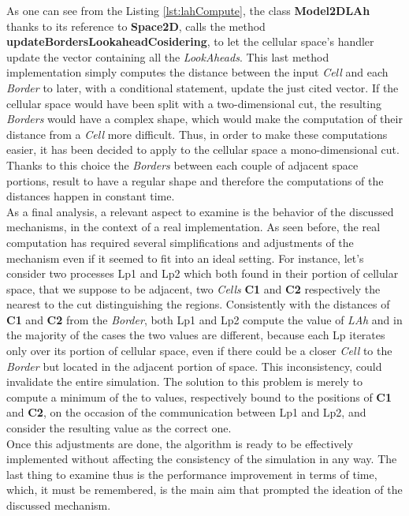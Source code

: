 \documentclass[12pt,a4paper,fleqn]{report}
\begin{document}
As one can see from the Listing \ref{lst:lahCompute}, the class \textbf{Model2DLAh} thanks to its reference to \textbf{Space2D}, calls the method \textbf{updateBordersLookaheadCosidering}, to let the cellular space's handler update the vector containing all the \textit{LookAheads}. This last method  implementation simply computes the distance between the input \textit{Cell} and each \textit{Border} to later, with a conditional statement, update the just cited vector. If the cellular space would have been split with a two-dimensional cut, the resulting \textit{Borders} would have a complex shape, which would make the computation of their distance from a \textit{Cell} more difficult. Thus, in order to make these computations easier, it has been decided to apply to the cellular space a mono-dimensional cut. Thanks to this choice the \textit{Borders} between each couple of adjacent space portions, result to have a regular shape and therefore the computations of the distances happen in constant time. \\
As a final analysis, a relevant aspect to examine is the behavior of the discussed mechanisms, in the context of a real implementation. As seen before, the real computation has required several simplifications and adjustments of the mechanism even if it seemed to fit into an ideal setting. For instance, let's consider two processes Lp1 and Lp2 which both found in their portion of cellular space, that we suppose to be adjacent, two \textit{Cells} \textbf{C1} and \textbf{C2} respectively the nearest to the cut distinguishing the regions. Consistently with the distances of \textbf{C1} and \textbf{C2} from the \textit{Border}, both Lp1 and Lp2 compute the value of \textit{LAh} and in the majority of the cases the two values are different, because each Lp iterates only over its portion of cellular space, even if there could be a closer \textit{Cell} to the \textit{Border} but located in the adjacent portion of space. This inconsistency, could invalidate the entire simulation. The solution to this problem is merely to compute a minimum of the to values, respectively bound to the positions of \textbf{C1} and \textbf{C2}, on the occasion of the communication between Lp1 and Lp2, and consider the resulting value as the correct one. \\
Once this adjustments are done, the algorithm is ready to be effectively implemented without affecting the consistency of the simulation in any way. The last thing to examine thus is the performance improvement in terms of time, which, it must be remembered, is the main aim that prompted the ideation of the discussed mechanism.
\newpage
\end{document}
